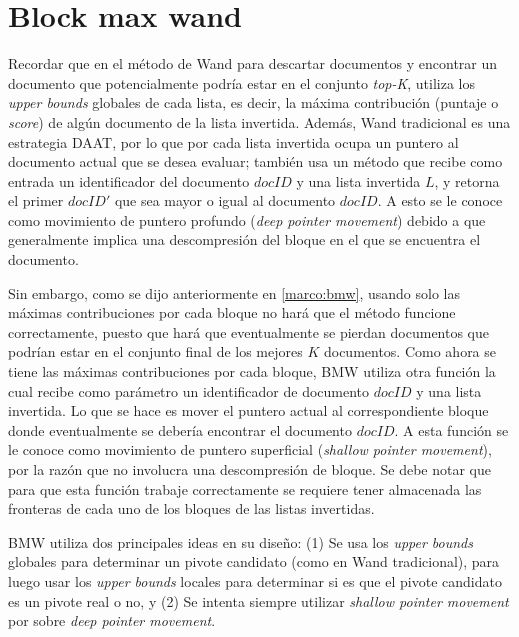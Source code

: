 \section{Block max wand}
Recordar que en el método de Wand para descartar documentos y encontrar un documento que potencialmente podría estar en el conjunto \textit{top-K}, utiliza los \textit{upper bounds} globales de cada lista, es decir, la máxima contribución (puntaje o \textit{score}) de algún documento de la lista invertida. Además, Wand tradicional es una estrategia DAAT, por lo que por cada lista invertida ocupa un puntero al documento actual que se desea evaluar; también usa un método que recibe como entrada un identificador del documento $docID$ y una lista invertida $L$, y retorna el primer $docID'$ que sea mayor o igual al documento $docID$. A esto se le conoce como movimiento de puntero profundo (\textit{deep pointer movement}) debido a que generalmente implica una descompresión del bloque en el que se encuentra el documento.

Sin embargo, como se dijo anteriormente en \ref{marco:bmw}, usando solo las máximas contribuciones por cada bloque no hará que el método funcione correctamente, puesto que hará que eventualmente se pierdan documentos que podrían estar en el conjunto final de los mejores $K$ documentos. Como ahora se tiene las máximas contribuciones por cada bloque, BMW utiliza otra función la cual recibe como parámetro un identificador de documento $docID$ y una lista invertida. Lo que se hace es mover el puntero actual al correspondiente bloque donde eventualmente se debería encontrar el documento $docID$. A esta función se le conoce como movimiento de puntero superficial (\textit{shallow pointer movement}), por la razón que no involucra una descompresión de bloque. Se debe notar que para que esta función trabaje correctamente se requiere tener almacenada las fronteras de cada uno de los bloques de las listas invertidas.

BMW utiliza dos principales ideas en su diseño: (1) Se usa los \textit{upper bounds} globales para determinar un pivote candidato (como en Wand tradicional), para luego usar los \textit{upper bounds} locales para determinar si es que el pivote candidato es un pivote real o no, y (2) Se intenta siempre utilizar \textit{shallow pointer movement} por sobre \textit{deep pointer movement}.

